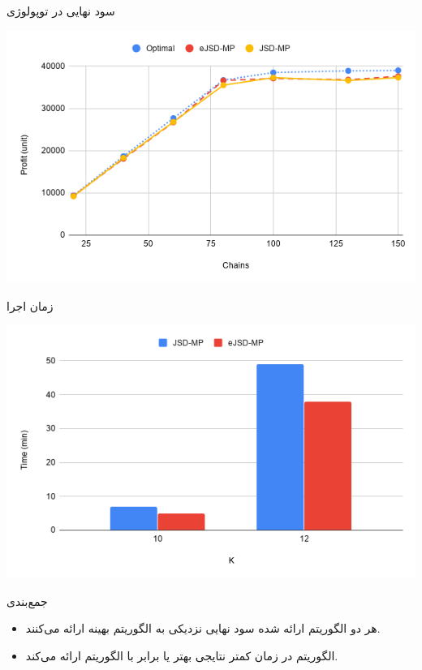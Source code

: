 \documentclass{beamer}
\makeatletter
\newcommand{\RTList}{\raggedleft\rightskip\@totalleftmargin}
\makeatother
\begin{document}
\begin{persian}
\begin{frame}{سود نهایی در توپولوژی }
\begin{center}
        \includegraphics[scale=0.5]{images/chart-6.png}
    \end{center}
\end{frame}
\begin{frame}{زمان اجرا}
    \begin{center}
        \includegraphics[scale=0.5]{images/chart-9.png}
    \end{center}
\end{frame}
\begin{frame}{جمع‌بندی}
    \begin{itemize}\RTList{}
        \item هر دو الگوریتم ارائه شده سود نهایی نزدیکی به الگوریتم بهینه ارائه می‌کنند.
        \item الگوریتم  در زمان کمتر نتایجی بهتر یا برابر با الگوریتم  ارائه می‌کند.
    \end{itemize}

\end{frame}
\end{persian}
\end{document}
